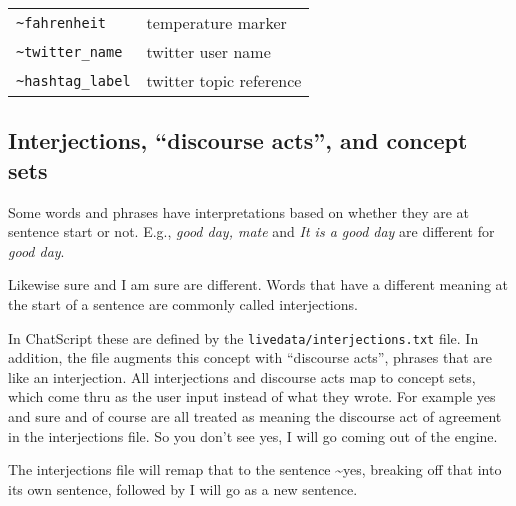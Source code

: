 \documentclass[]{article}
\begin{document}
\begin{longtable}[]{@{}ll@{}}
\begin{minipage}[t]{0.22\columnwidth}
\texttt{\textasciitilde{}fahrenheit}\strut
\end{minipage} & \begin{minipage}[t]{0.10\columnwidth}\raggedright\strut
temperature marker\strut
\end{minipage}\tabularnewline
\begin{minipage}[t]{0.22\columnwidth}\raggedright\strut
\texttt{\textasciitilde{}twitter\_name}\strut
\end{minipage} & \begin{minipage}[t]{0.10\columnwidth}\raggedright\strut
twitter user name\strut
\end{minipage}\tabularnewline
\begin{minipage}[t]{0.22\columnwidth}\raggedright\strut
\texttt{\textasciitilde{}hashtag\_label}\strut
\end{minipage} & \begin{minipage}[t]{0.10\columnwidth}\raggedright\strut
twitter topic reference\strut
\end{minipage}\tabularnewline
\bottomrule
\end{longtable}

\subsection{\texorpdfstring{Interjections, ``discourse acts'', and
concept
sets}{Interjections, discourse acts, and concept sets}}\label{interjections-discourse-acts-and-concept-sets}

Some words and phrases have interpretations based on whether they are at
sentence start or not. E.g., \emph{good day, mate} and \emph{It is a
good day} are different for \emph{good day}.

Likewise sure and I am sure are different. Words that have a different
meaning at the start of a sentence are commonly called interjections.

In ChatScript these are defined by the
\texttt{livedata/interjections.txt} file. In addition, the file augments
this concept with ``discourse acts'', phrases that are like an
interjection. All interjections and discourse acts map to concept sets,
which come thru as the user input instead of what they wrote. For
example yes and sure and of course are all treated as meaning the
discourse act of agreement in the interjections file. So you don't see
yes, I will go coming out of the engine.

The interjections file will remap that to the sentence
\textasciitilde{}yes, breaking off that into its own sentence, followed
by I will go as a new sentence.
\end{document}
